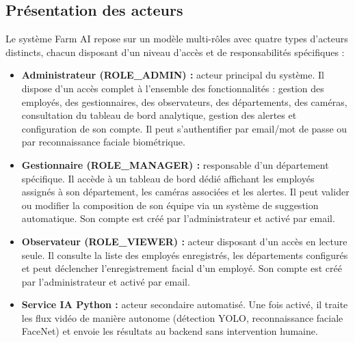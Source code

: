 

\subsection{Présentation des acteurs}

Le système Farm AI repose sur un modèle multi-rôles avec quatre types d'acteurs distincts,
chacun disposant d'un niveau d'accès et de responsabilités spécifiques :

\begin{itemize}
  \item \textbf{Administrateur (ROLE\_ADMIN) :} acteur principal du système. Il dispose d'un
    accès complet à l'ensemble des fonctionnalités : gestion des employés, des gestionnaires,
    des observateurs, des départements, des caméras, consultation du tableau de bord analytique,
    gestion des alertes et configuration de son compte. Il peut s'authentifier par email/mot de
    passe ou par reconnaissance faciale biométrique.
  \item \textbf{Gestionnaire (ROLE\_MANAGER) :} responsable d'un département spécifique. Il
    accède à un tableau de bord dédié affichant les employés assignés à son département, les
    caméras associées et les alertes. Il peut valider ou modifier la composition de son équipe
    via un système de suggestion automatique. Son compte est créé par l'administrateur et
    activé par email.
  \item \textbf{Observateur (ROLE\_VIEWER) :} acteur disposant d'un accès en lecture seule.
    Il consulte la liste des employés enregistrés, les départements configurés et peut
    déclencher l'enregistrement facial d'un employé. Son compte est créé par l'administrateur
    et activé par email.
  \item \textbf{Service IA Python :} acteur secondaire automatisé. Une fois activé, il traite
    les flux vidéo de manière autonome (détection YOLO, reconnaissance faciale FaceNet) et
    envoie les résultats au backend sans intervention humaine.
\end{itemize}

